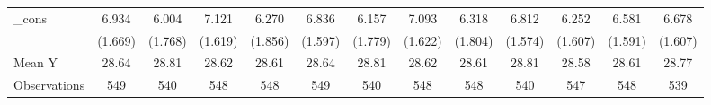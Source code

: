 {\begin{tabular}{l*{12}{c}}
\addlinespace
\_cons      &       6.934\sym{***}&       6.004\sym{***}&       7.121\sym{***}&       6.270\sym{***}&       6.836\sym{***}&       6.157\sym{***}&       7.093\sym{***}&       6.318\sym{***}&       6.812\sym{***}&       6.252\sym{***}&       6.581\sym{***}&       6.678\sym{***}\\
            &     (1.669)         &     (1.768)         &     (1.619)         &     (1.856)         &     (1.597)         &     (1.779)         &     (1.622)         &     (1.804)         &     (1.574)         &     (1.607)         &     (1.591)         &     (1.607)         \\
\midrule
Mean Y      &       28.64         &       28.81         &       28.62         &       28.61         &       28.64         &       28.81         &       28.62         &       28.61         &       28.81         &       28.58         &       28.61         &       28.77         \\
Observations&         549         &         540         &         548         &         548         &         549         &         540         &         548         &         548         &         540         &         547         &         548         &         539         \\
\bottomrule
\end{tabular}
}
